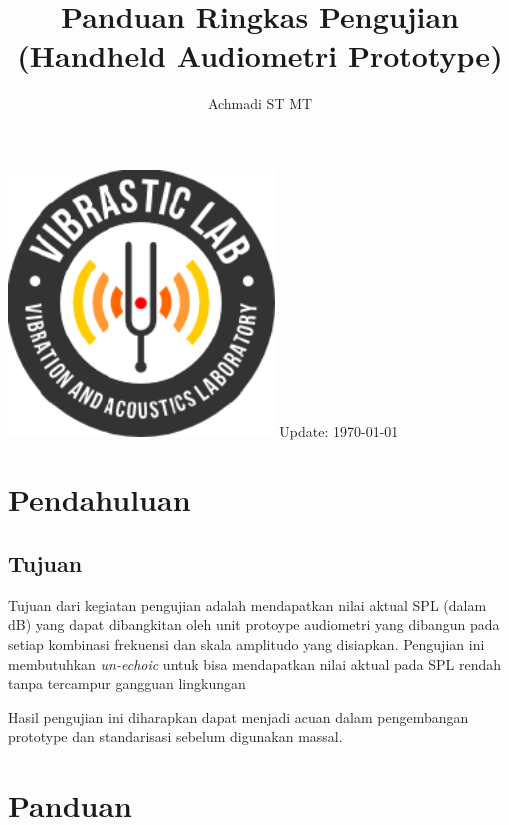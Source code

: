 \documentclass[12pt,]{article}
\title{\LARGE \bf
	Panduan Ringkas Pengujian\\
	\small{(Handheld Audiometri Prototype)}
}
\author{Achmadi ST MT}
\date{}
\begin{document}
	\thispagestyle{empty}
	
	\begin{titlepage}
		\centering
		\vfill
		\vfill
		\maketitle
		\vfill
		\includegraphics[width=200pt]{images/logo/logoviblab}
		\vfill
		\vfill
		Update: {\today} \currenttime \\
	\end{titlepage}
	
	
	\newpage
	\tableofcontents
	
	
	\newpage
	\section{Pendahuluan}
	
	\subsection{Tujuan}
	
	Tujuan dari kegiatan pengujian adalah mendapatkan nilai aktual SPL (dalam dB) yang dapat dibangkitan
	oleh unit protoype audiometri yang dibangun pada setiap kombinasi frekuensi dan skala amplitudo yang disiapkan.
	Pengujian ini membutuhkan \textit{un-echoic} untuk bisa mendapatkan nilai aktual pada SPL rendah tanpa tercampur gangguan lingkungan
	
	Hasil pengujian ini diharapkan dapat menjadi acuan dalam pengembangan prototype dan standarisasi sebelum digunakan massal.
	
	\newpage
	\section{Panduan}
	
\end{document}
